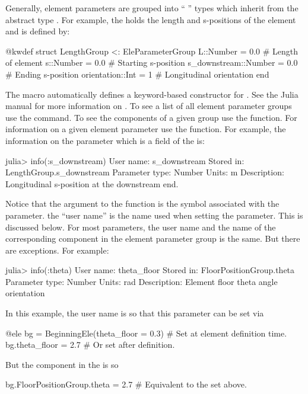 Generally, element parameters are grouped into ``  '' 
types which inherit from the abstract type .
For example, the  holds the length and s-positions of the element and is defined by:
\begin{example}
  @kwdef struct LengthGroup <: EleParameterGroup
    L::Number = 0.0               # Length of element
    s::Number = 0.0               # Starting s-position
    s_downstream::Number = 0.0    # Ending s-position
    orientation::Int = 1          # Longitudinal orientation
  end
\end{example}
The  macro automatically defines a keyword-based constructor for .
See the Julia manual for more information on . 
To see a list of all element parameter groups use the  command.
To see the components of a given group use the  function. For information on
a given element parameter use the  function. For example, the information on
the  parameter which is a field of the  is:
\begin{example}
  julia> info(:s_downstream)
    User name:       s_downstream
    Stored in:       LengthGroup.s_downstream
    Parameter type:  Number
    Units:           m
    Description:     Longitudinal s-position at the downstream end.
\end{example}
Notice that the argument to the  function is the symbol associated with the parameter.
the ``user name'' is the name used when setting the parameter. This is discussed below. For most
parameters, the user name and the name of the corresponding component in the element parameter
group is the same. But there are exceptions. For example:
\begin{example}
  julia> info(:theta)
    User name:       theta_floor
    Stored in:       FloorPositionGroup.theta
    Parameter type:  Number
    Units:           rad
    Description:     Element floor theta angle orientation
\end{example}
In this example, the user name is  so that this parameter can be set via
\begin{example}
  @ele bg = BeginningEle(theta_floor = 0.3)    # Set at element definition time.
  bg.theta_floor = 2.7                         # Or set after definition.
\end{example}
But the component in the  is  so
\begin{example}
  bg.FloorPositionGroup.theta = 2.7   # Equivalent to the set above.
\end{example}

